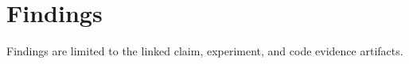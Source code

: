 \section{Findings}
Findings are limited to the linked claim, experiment, and code evidence artifacts.
